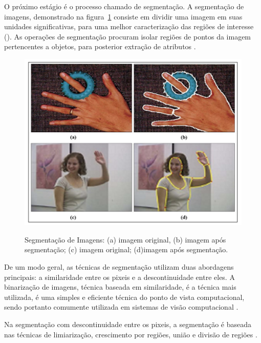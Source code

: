 O próximo estágio é o processo chamado de segmentação. A segmentação de imagens, demonstrado na figura~\ref{fig:segmentacao} consiste em dividir uma imagem em suas unidades significativas, para uma melhor caracterização das regiões de interesse (). As operações de segmentação procuram isolar regiões de pontos da imagem pertencentes a objetos, para posterior extração de atributos \cite{Lourdes2010}.
 \begin{figure}[h]
	\centering
	\includegraphics[width=1.0\textwidth]{Imagens/segmentacao} %
	\caption[Segmentação de Imagens: (a) imagem original, (b) imagem após segmentação; (c) imagem original; (d)imagem após segmentação.]{Segmentação de Imagens: (a) imagem original, (b) imagem após segmentação; (c) imagem original; (d)imagem após segmentação.}
	\label{fig:segmentacao}
\end{figure}
De um modo geral, as técnicas de segmentação utilizam duas abordagens principais: a similaridade entre os pixeis e a descontinuidade entre eles. A binarização de imagens, técnica baseada em similaridade, é a técnica mais utilizada, é uma  simples e eficiente técnica do ponto de vista computacional, sendo portanto comumente utilizada em sistemas de visão computacional \cite{ISRAEL2003}.

Na segmentação com descontinuidade entre os pixeis, a segmentação é baseada nas técnicas de limiarização, crescimento por regiões, união e divisão de regiões \cite{Rodrigues2002}.  %

